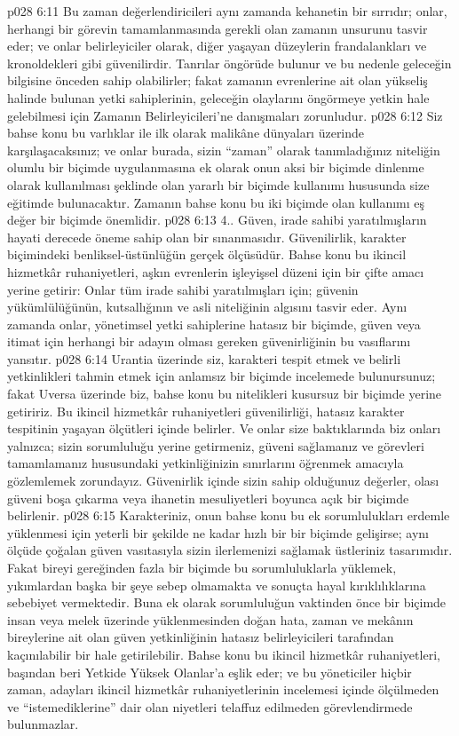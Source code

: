 \vs p028 6:11 Bu zaman değerlendiricileri aynı zamanda kehanetin bir sırrıdır; onlar, herhangi bir görevin tamamlanmasında gerekli olan zamanın unsurunu tasvir eder; ve onlar belirleyiciler olarak, diğer yaşayan düzeylerin frandalankları ve kronoldekleri gibi güvenilirdir. Tanrılar öngörüde bulunur ve bu nedenle geleceğin bilgisine önceden sahip olabilirler; fakat zamanın evrenlerine ait olan yükseliş halinde bulunan yetki sahiplerinin, geleceğin olaylarını öngörmeye yetkin hale gelebilmesi için Zamanın Belirleyicileri’ne danışmaları zorunludur.
\vs p028 6:12 Siz bahse konu bu varlıklar ile ilk olarak malikâne dünyaları üzerinde karşılaşacaksınız; ve onlar burada, sizin “zaman” olarak tanımladığınız niteliğin olumlu bir biçimde uygulanmasına ek olarak onun aksi bir biçimde dinlenme olarak kullanılması şeklinde olan yararlı bir biçimde kullanımı hususunda size eğitimde bulunacaktır. Zamanın bahse konu bu iki biçimde olan kullanımı eş değer bir biçimde önemlidir.
\vs p028 6:13 4.\bibnobreakspace {}. Güven, irade sahibi yaratılmışların hayati derecede öneme sahip olan bir sınanmasıdır. Güvenilirlik, karakter biçimindeki benliksel\hyp{}üstünlüğün gerçek ölçüsüdür. Bahse konu bu ikincil hizmetkâr ruhaniyetleri, aşkın evrenlerin işleyişsel düzeni için bir çifte amacı yerine getirir: Onlar tüm irade sahibi yaratılmışları için; güvenin yükümlülüğünün, kutsallığının ve asli niteliğinin algısını tasvir eder. Aynı zamanda onlar, yönetimsel yetki sahiplerine hatasız bir biçimde, güven veya itimat için herhangi bir adayın olması gereken güvenirliğinin bu vasıflarını yansıtır.
\vs p028 6:14 Urantia üzerinde siz, karakteri tespit etmek ve belirli yetkinlikleri tahmin etmek için anlamsız bir biçimde incelemede bulunursunuz; fakat Uversa üzerinde biz, bahse konu bu nitelikleri kusursuz bir biçimde yerine getiririz. Bu ikincil hizmetkâr ruhaniyetleri güvenilirliği, hatasız karakter tespitinin yaşayan ölçütleri içinde belirler. Ve onlar size baktıklarında biz onları yalnızca; sizin sorumluluğu yerine getirmeniz, güveni sağlamanız ve görevleri tamamlamanız hususundaki yetkinliğinizin sınırlarını öğrenmek amacıyla gözlemlemek zorundayız. Güvenirlik içinde sizin sahip olduğunuz değerler, olası güveni boşa çıkarma veya ihanetin mesuliyetleri boyunca açık bir biçimde belirlenir.
\vs p028 6:15 Karakteriniz, onun bahse konu bu ek sorumlulukları erdemle yüklenmesi için yeterli bir şekilde ne kadar hızlı bir bir biçimde gelişirse; aynı ölçüde çoğalan güven vasıtasıyla sizin ilerlemenizi sağlamak üstleriniz tasarımıdır. Fakat bireyi gereğinden fazla bir biçimde bu sorumluluklarla yüklemek, yıkımlardan başka bir şeye sebep olmamakta ve sonuçta hayal kırıklılıklarına sebebiyet vermektedir. Buna ek olarak sorumluluğun vaktinden önce bir biçimde insan veya melek üzerinde yüklenmesinden doğan hata, zaman ve mekânın bireylerine ait olan güven yetkinliğinin hatasız belirleyicileri tarafından kaçınılabilir bir hale getirilebilir. Bahse konu bu ikincil hizmetkâr ruhaniyetleri, başından beri Yetkide Yüksek Olanlar’a eşlik eder; ve bu yöneticiler hiçbir zaman, adayları ikincil hizmetkâr ruhaniyetlerinin incelemesi içinde ölçülmeden ve “istemediklerine” dair olan niyetleri telaffuz edilmeden görevlendirmede bulunmazlar.
